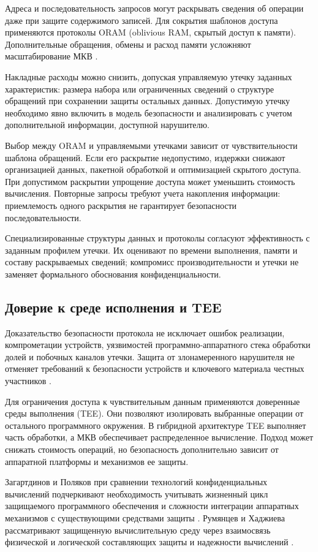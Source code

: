Адреса и последовательность запросов могут раскрывать сведения об операции даже при защите содержимого записей. Для сокрытия шаблонов доступа применяются протоколы ORAM (oblivious RAM, скрытый доступ к памяти). Дополнительные обращения, обмены и расход памяти усложняют масштабирование МКВ \cite{06}.

Накладные расходы можно снизить, допуская управляемую утечку заданных характеристик: размера набора или ограниченных сведений о структуре обращений при сохранении защиты остальных данных. Допустимую утечку необходимо явно включить в модель безопасности и анализировать с учетом дополнительной информации, доступной нарушителю.

Выбор между ORAM и управляемыми утечками зависит от чувствительности шаблона обращений. Если его раскрытие недопустимо, издержки снижают организацией данных, пакетной обработкой и оптимизацией скрытого доступа. При допустимом раскрытии упрощение доступа может уменьшить стоимость вычисления. Повторные запросы требуют учета накопления информации: приемлемость одного раскрытия не гарантирует безопасности последовательности.

Специализированные структуры данных и протоколы согласуют эффективность с заданным профилем утечки. Их оценивают по времени выполнения, памяти и составу раскрываемых сведений; компромисс производительности и утечки не заменяет формального обоснования конфиденциальности.

\subsection{Доверие к среде исполнения и TEE}
\label{subsec:tee}

Доказательство безопасности протокола не исключает ошибок реализации, компрометации устройств, уязвимостей программно-аппаратного стека обработки долей и побочных каналов утечки. Защита от злонамеренного нарушителя не отменяет требований к безопасности устройств и ключевого материала честных участников \cite{06}.

Для ограничения доступа к чувствительным данным применяются доверенные среды выполнения (TEE). Они позволяют изолировать выбранные операции от остального программного окружения. В гибридной архитектуре TEE выполняет часть обработки, а МКВ обеспечивает распределенное вычисление. Подход может снижать стоимость операций, но безопасность дополнительно зависит от аппаратной платформы и механизмов ее защиты.

Загартдинов и Поляков при сравнении технологий конфиденциальных вычислений подчеркивают необходимость учитывать жизненный цикл защищаемого программного обеспечения и сложности интеграции аппаратных механизмов с существующими средствами защиты \cite{01}. Румянцев и Хаджиева рассматривают защищенную вычислительную среду через взаимосвязь физической и логической составляющих защиты и надежности вычислений \cite{03}.

